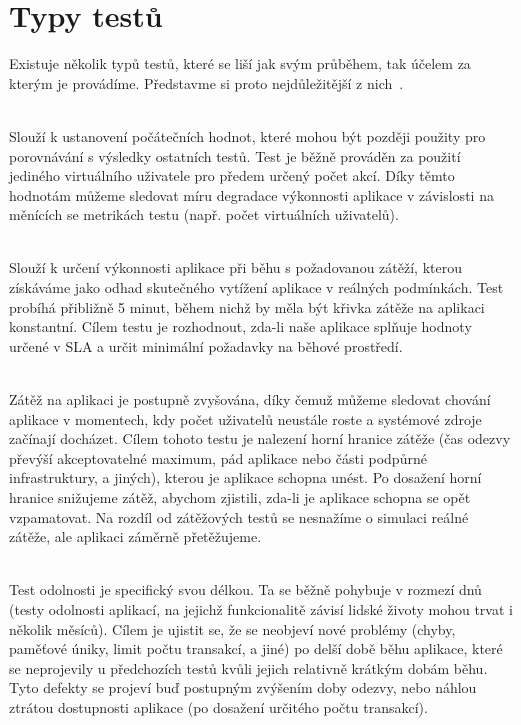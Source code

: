\documentclass[122pt,oneside]{fithesis}
\begin{document}
\section{Typy testů}
Existuje několik typů testů, které se liší jak svým průběhem, tak účelem za kterým je provádíme. Představme si proto nejdůležitější z nich~\cite{loadTest}.

\vspace{5 mm}
\\\indent Slouží k ustanovení počátečních hodnot, které mohou být později použity pro porovnávání s výsledky ostatních testů. Test je běžně prováděn za použití jediného virtuálního uživatele pro předem určený počet akcí. Díky těmto hodnotám můžeme sledovat míru degradace výkonnosti aplikace v závislosti na měnících se metrikách testu (např. počet virtuálních uživatelů).

\vspace{5 mm}
\\\indent Slouží k určení výkonnosti aplikace při běhu s požadovanou zátěží, kterou získáváme jako odhad skutečného vytížení aplikace v reálných podmínkách. Test probíhá přibližně 5 minut, během nichž by měla být křivka zátěže na aplikaci konstantní. Cílem testu je rozhodnout, zda-li naše aplikace splňuje hodnoty určené v SLA a určit minimální požadavky na běhové prostředí.

\vspace{5 mm}
\\\indent Zátěž na aplikaci je postupně zvyšována, díky čemuž můžeme sledovat chování aplikace v momentech, kdy počet uživatelů neustále roste a systémové zdroje začínají docházet. Cílem tohoto testu je nalezení horní hranice zátěže (čas odezvy převýší akceptovatelné maximum, pád aplikace nebo části podpůrné infrastruktury, a jiných), kterou je aplikace schopna unést. Po dosažení horní hranice snižujeme zátěž, abychom zjistili, zda-li je aplikace schopna se opět vzpamatovat. Na rozdíl od zátěžových testů se nesnažíme o simulaci reálné zátěže, ale aplikaci záměrně přetěžujeme.

\vspace{5 mm}
\\\indent Test odolnosti je specifický svou délkou. Ta se běžně pohybuje v rozmezí dnů (testy odolnosti aplikací, na jejichž funkcionalitě závisí lidské životy mohou trvat i několik měsíců). Cílem je ujistit se, že se neobjeví nové problémy (chyby, paměťové úniky, limit počtu transakcí, a jiné) po delší době běhu aplikace, které se neprojevily u předchozích testů kvůli jejich relativně krátkým dobám běhu. Tyto defekty se projeví buď postupným zvýšením doby odezvy, nebo náhlou ztrátou dostupnosti aplikace (po dosažení určitého počtu transakcí).
\end{document}
